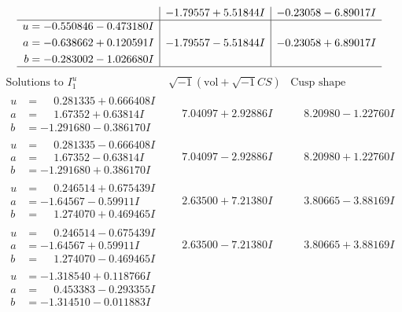 \documentclass[1p]{elsarticle_modified}
\theoremstyle{definition}
\newcommand{\I}{\sqrt{-1}}
\begin{document}
$$\begin{array}{c|c|c}
 & -1.79557 + 5.51844 I & -0.23058 - 6.89017 I \\ \hline\begin{aligned}
u &= -0.550846 - 0.473180 I \\
a &= -0.638662 + 0.120591 I \\
b &= -0.283002 - 1.026680 I\end{aligned}
 & -1.79557 - 5.51844 I & -0.23058 + 6.89017 I\\
 \hline 
 \end{array}$$\newpage$$\begin{array}{c|c|c}  
\text{Solutions to }I^u_{1}& \I (\text{vol} + \sqrt{-1}CS) & \text{Cusp shape}\\
 \hline 
\begin{aligned}
u &= \phantom{-}0.281335 + 0.666408 I \\
a &= \phantom{-}1.67352 + 0.63814 I \\
b &= -1.291680 - 0.386170 I\end{aligned}
 & \phantom{-}7.04097 + 2.92886 I & \phantom{-}8.20980 - 1.22760 I \\ \hline\begin{aligned}
u &= \phantom{-}0.281335 - 0.666408 I \\
a &= \phantom{-}1.67352 - 0.63814 I \\
b &= -1.291680 + 0.386170 I\end{aligned}
 & \phantom{-}7.04097 - 2.92886 I & \phantom{-}8.20980 + 1.22760 I \\ \hline\begin{aligned}
u &= \phantom{-}0.246514 + 0.675439 I \\
a &= -1.64567 - 0.59911 I \\
b &= \phantom{-}1.274070 + 0.469465 I\end{aligned}
 & \phantom{-}2.63500 + 7.21380 I & \phantom{-}3.80665 - 3.88169 I \\ \hline\begin{aligned}
u &= \phantom{-}0.246514 - 0.675439 I \\
a &= -1.64567 + 0.59911 I \\
b &= \phantom{-}1.274070 - 0.469465 I\end{aligned}
 & \phantom{-}2.63500 - 7.21380 I & \phantom{-}3.80665 + 3.88169 I \\ \hline\begin{aligned}
u &= -1.318540 + 0.118766 I \\
a &= \phantom{-}0.453383 - 0.293355 I \\
b &= -1.314510 - 0.011883 I\end{aligned}

\end{array}$$
\end{document}
